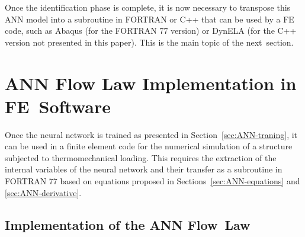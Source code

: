 \documentclass[algorithms,article,accept,pdftex,moreauthors]{Definitions/mdpi}
\begin{document}
Once the identification phase is complete, it is now necessary to transpose this ANN model into a subroutine in FORTRAN or C++ that can be used by a FE code, such as Abaqus (for the FORTRAN 77 version) or DynELA (for the C++ version not presented in this paper).
This is the main topic of the next~section.

\section{ANN Flow Law Implementation in FE~Software}\label{sec:Use}

Once the neural network is trained as presented in Section~\ref{sec:ANN-traning}, it can be used in a finite element code for the numerical simulation of a structure subjected to thermomechanical loading.
This requires the extraction of the internal variables of the neural network and their transfer as a subroutine in FORTRAN 77 based on equations proposed in Sections~\ref{sec:ANN-equations} and \ref{sec:ANN-derivative}.

\subsection{Implementation of the ANN Flow~Law}\label{sec:Implementation}
\end{document}
